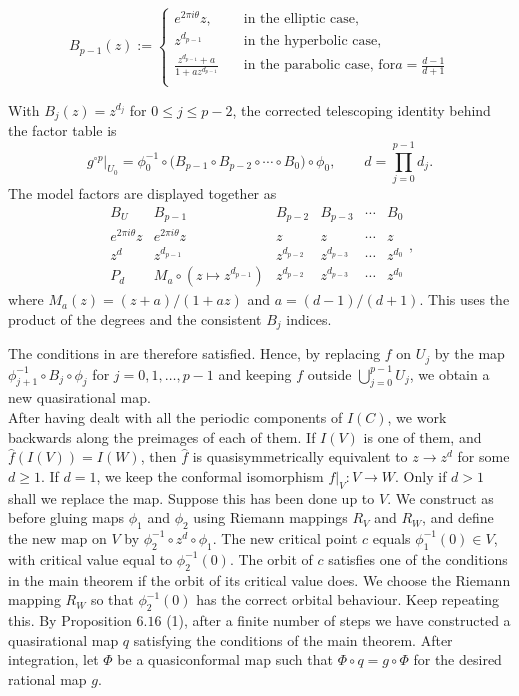 \documentclass[11pt,a4paper]{article}
\begin{document}
    $$B_{p-1}(z):= \begin{cases}
        e^{2\pi i \theta}z, &\quad\text{in the elliptic case,}\\
        z^{d_{p-1}} &\quad\text{in the hyperbolic case,}\\
        \frac{z^{d_{p-1}}+a}{1 + az^{d_{p-1}}} &\quad\text{in the parabolic case, for}   a = \frac{d-1}{d+1}\\
        \end{cases}$$

    With $B_j(z)=z^{d_j}$ for $0\leq j\leq p-2$, the corrected telescoping identity behind the factor table is
    \[
    g^{\circ p}\big|_{U_0}
      =\phi_0^{-1}\circ
        \bigl(B_{p-1}\circ B_{p-2}\circ\cdots\circ B_0\bigr)
        \circ\phi_0,
    \qquad d=\prod_{j=0}^{p-1}d_j.
    \]
    The model factors are displayed together as
    \[
    \begin{array}{c|ccccc}
    B_U&B_{p-1}&B_{p-2}&B_{p-3}&\cdots&B_0\\ \hline
    e^{2\pi i\theta}z&e^{2\pi i\theta}z&z&z&\cdots&z\\
    z^d&z^{d_{p-1}}&z^{d_{p-2}}&z^{d_{p-3}}&\cdots&z^{d_0}\\
    P_d&M_a\circ(z\mapsto z^{d_{p-1}})&z^{d_{p-2}}&z^{d_{p-3}}&\cdots&z^{d_0}
    \end{array},
    \]
    where $M_a(z)=(z+a)/(1+az)$ and $a=(d-1)/(d+1)$. This uses the product of the degrees and the consistent $B_j$ indices.


    The conditions in  are therefore satisfied. Hence, by replacing $f$ on $U_j$ by the map $\phi_{j+1}^{-1}\circ B_j\circ \phi_j$ for $j = 0, 1, \ldots, p-1$ and keeping $f$ outside $\bigcup_{j=0}^{p-1}{U_j}$, we obtain a new quasirational map.\\
    After having dealt with all the periodic components of $I(C)$, we work backwards along the preimages of each of them. If $I(V)$ is one of them, and $\hat{f}(I(V)) = I(W)$, then $\hat{f}$ is quasisymmetrically equivalent to $z\rightarrow z^d$ for some $d\geq 1$. If $d=1$, we keep the conformal isomorphism $f\big|_V:V\rightarrow W$. Only if $d>1$ shall we replace the map. Suppose this has been done up to $V$. We construct as before gluing maps $\phi_1$ and $\phi_2$ using Riemann mappings $R_V$ and $R_W$, and define the new map on $V$ by $\phi_2^{-1}\circ z^d\circ \phi_1$. The new critical point $c$ equals $\phi_1^{-1}(0) \in V$, with critical value equal to $\phi_2^{-1}(0)$. The orbit of $c$ satisfies one of the conditions in the main theorem if the orbit of its critical value does. We choose the Riemann mapping $R_W$ so that $\phi_2^{-1}(0)$ has the correct orbital behaviour. Keep repeating this. By Proposition $6.16$ (1), after a finite number of steps we have constructed a quasirational map $q$ satisfying the conditions of the main theorem. After integration, let $\Phi$ be a quasiconformal map such that $\Phi\circ q=g\circ\Phi$ for the desired rational map $g$.\\
\end{document}
